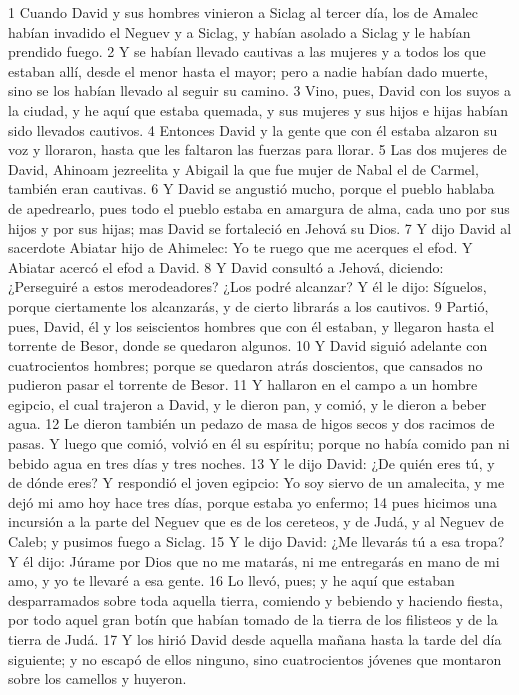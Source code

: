 1 Cuando David y sus hombres vinieron a Siclag al tercer día, los de Amalec habían invadido el Neguev y a Siclag, y habían asolado a Siclag y le habían prendido fuego.
2 Y se habían llevado cautivas a las mujeres y a todos los que estaban allí, desde el menor hasta el mayor; pero a nadie habían dado muerte, sino se los habían llevado al seguir su camino.
3 Vino, pues, David con los suyos a la ciudad, y he aquí que estaba quemada, y sus mujeres y sus hijos e hijas habían sido llevados cautivos.
4 Entonces David y la gente que con él estaba alzaron su voz y lloraron, hasta que les faltaron las fuerzas para llorar.
5 Las dos mujeres de David, Ahinoam jezreelita y Abigail la que fue mujer de Nabal el de Carmel, también eran cautivas. 
6 Y David se angustió mucho, porque el pueblo hablaba de apedrearlo, pues todo el pueblo estaba en amargura de alma, cada uno por sus hijos y por sus hijas; mas David se fortaleció en Jehová su Dios.
7 Y dijo David al sacerdote Abiatar hijo de Ahimelec: Yo te ruego que me acerques el efod. Y Abiatar acercó el efod a David.
8 Y David consultó a Jehová, diciendo: ¿Perseguiré a estos merodeadores? ¿Los podré alcanzar? Y él le dijo: Síguelos, porque ciertamente los alcanzarás, y de cierto librarás a los cautivos.
9 Partió, pues, David, él y los seiscientos hombres que con él estaban, y llegaron hasta el torrente de Besor, donde se quedaron algunos.
10 Y David siguió adelante con cuatrocientos hombres; porque se quedaron atrás doscientos, que cansados no pudieron pasar el torrente de Besor.
11 Y hallaron en el campo a un hombre egipcio, el cual trajeron a David, y le dieron pan, y comió, y le dieron a beber agua.
12 Le dieron también un pedazo de masa de higos secos y dos racimos de pasas. Y luego que comió, volvió en él su espíritu; porque no había comido pan ni bebido agua en tres días y tres noches.
13 Y le dijo David: ¿De quién eres tú, y de dónde eres? Y respondió el joven egipcio: Yo soy siervo de un amalecita, y me dejó mi amo hoy hace tres días, porque estaba yo enfermo;
14 pues hicimos una incursión a la parte del Neguev que es de los cereteos, y de Judá, y al Neguev de Caleb; y pusimos fuego a Siclag.
15 Y le dijo David: ¿Me llevarás tú a esa tropa? Y él dijo: Júrame por Dios que no me matarás, ni me entregarás en mano de mi amo, y yo te llevaré a esa gente.
16 Lo llevó, pues; y he aquí que estaban desparramados sobre toda aquella tierra, comiendo y bebiendo y haciendo fiesta, por todo aquel gran botín que habían tomado de la tierra de los filisteos y de la tierra de Judá.
17 Y los hirió David desde aquella mañana hasta la tarde del día siguiente; y no escapó de ellos ninguno, sino cuatrocientos jóvenes que montaron sobre los camellos y huyeron.
